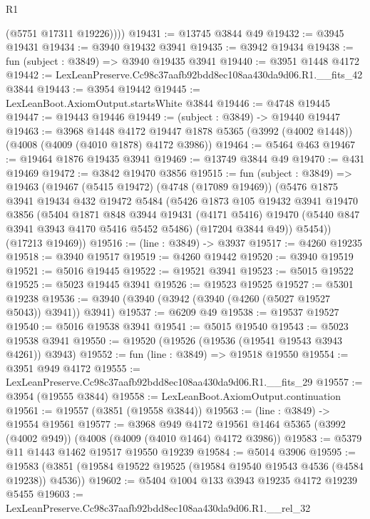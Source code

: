 \begin{lexlean}{R1}
\begin{coremodule}
          (@5751 @17311 @19226))))
@19431 := @13745 @3844 @49
@19432 := @3945 @19431
@19434 := @3940 @19432 @3941
@19435 := @3942 @19434
@19438 := fun (subject : @3849) => @3940 @19435 @3941
@19440 := @3951 @1448 @4172
@19442 := LexLeanPreserve.Cc98c37aafb92bdd8ec108aa430da9d06.R1.__fits_42 @3844
@19443 := @3954 @19442
@19445 := LexLeanBoot.AxiomOutput.startsWhite @3844
@19446 := @4748 @19445
@19447 := @19443 @19446
@19449 := (subject : @3849) -> @19440 @19447
@19463 := @3968
    @1448
    @4172
    @19447
    @1878
    @5365
    (@3992 (@4002 @1448))
    (@4008 (@4009 (@4010 @1878) @4172 @3986))
@19464 := @5464 @463
@19467 := @19464 @1876 @19435 @3941
@19469 := @13749 @3844 @49
@19470 := @431 @19469
@19472 := @3842 @19470 @3856
@19515 := fun (subject : @3849) =>
  @19463
    (@19467
      (@5415 @19472)
      (@4748 (@17089 @19469))
      (@5476
        @1875
        @3941
        @19434
        @432
        @19472
        @5484
        (@5426
          @1873
          @105
          @19432
          @3941
          @19470
          @3856
          (@5404
            @1871
            @848
            @3944
            @19431
            (@4171 @5416)
            @19470
            (@5440 @847 @3941 @3943 @4170 @5416 @5452 @5486)
            (@17204 @3844 @49))
          @5454))
      (@17213 @19469))
@19516 := (line : @3849) -> @3937
@19517 := @4260 @19235
@19518 := @3940 @19517
@19519 := @4260 @19442
@19520 := @3940 @19519
@19521 := @5016 @19445
@19522 := @19521 @3941
@19523 := @5015 @19522
@19525 := @5023 @19445 @3941
@19526 := @19523 @19525
@19527 := @5301 @19238
@19536 := @3940 (@3940 (@3942 (@3940 (@4260 (@5027 @19527 @5043)) @3941)) @3941)
@19537 := @6209 @49
@19538 := @19537 @19527
@19540 := @5016 @19538 @3941
@19541 := @5015 @19540
@19543 := @5023 @19538 @3941
@19550 := @19520 (@19526 (@19536 (@19541 @19543 @3943 @4261)) @3943)
@19552 := fun (line : @3849) => @19518 @19550
@19554 := @3951 @949 @4172
@19555 := LexLeanPreserve.Cc98c37aafb92bdd8ec108aa430da9d06.R1.__fits_29
@19557 := @3954 (@19555 @3844)
@19558 := LexLeanBoot.AxiomOutput.continuation
@19561 := @19557 (@3851 (@19558 @3844))
@19563 := (line : @3849) -> @19554 @19561
@19577 := @3968
    @949
    @4172
    @19561
    @1464
    @5365
    (@3992 (@4002 @949))
    (@4008 (@4009 (@4010 @1464) @4172 @3986))
@19583 := @5379 @11 @1443 @1462 @19517 @19550 @19239
@19584 := @5014 @3906
@19595 := @19583 (@3851 (@19584 @19522 @19525 (@19584 @19540 @19543 @4536 (@4584 @19238)) @4536))
@19602 := @5404 @1004 @133 @3943 @19235 @4172 @19239 @5455
@19603 := LexLeanPreserve.Cc98c37aafb92bdd8ec108aa430da9d06.R1.__rel_32

\end{coremodule}
\end{lexlean}
